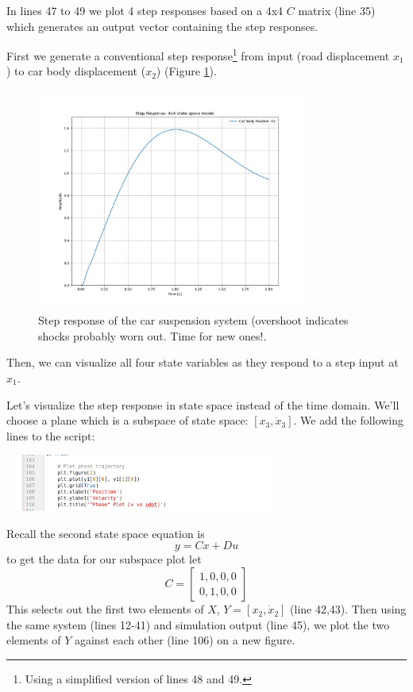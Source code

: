 In lines 47 to 49 we plot 4 step responses based on a 4x4 $C$ matrix (line 35) which generates
an output vector containing the step responses.

First we generate a conventional step response\footnote{Using a simplified version of lines
48 and 49.} from input (road displacement $x_1$) to car body
displacement ($x_2$) (Figure \ref{graphsuspensionstep}).

\begin{figure}\centering
\includegraphics[width=3.5in]{figs04/singleCarBodyStep.png}
\caption{Step response of the car suspension system (overshoot indicates shocks probably
    worn out. Time for new ones!.}\label{graphsuspensionstep}
\end{figure}

Then, we can visualize all four state variables as they respond to a step input at $x_1$.

Let's visualize the step response in state space instead of the time domain.   We'll choose
a plane which is a subspace of state space: $[x_3, \dot{x}_3]$.   We add the following lines
to the script:

\begin{center}
\includegraphics[width=3.5in]{figs04/ss_phase_addon.png}
\end{center}

Recall the second state space equation is
\[
y=Cx+Du
\]
to get the data for our subspace plot let
\[
C = \begin{bmatrix} 1,0,0,0 \\ 0,1,0,0 \end{bmatrix}
\]
This selects out the first two elements of $X$, $Y=[x_2, \dot{x}_2]$ (line 42,43).  Then using
the same system (lines 12-41) and simulation output (line 45),
we plot the two elements of $Y$ against each other (line 106) on a new figure.

